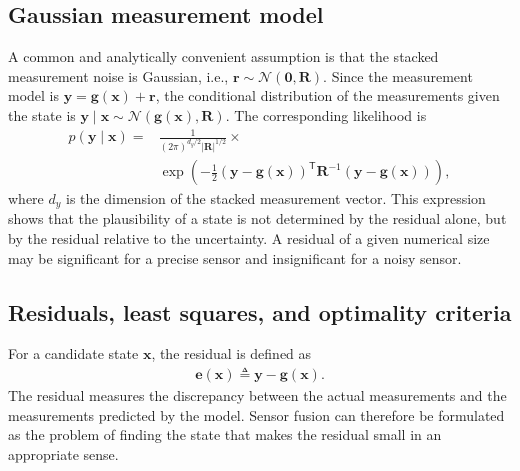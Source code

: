 \documentclass[11pt,oneside,openany]{book}
\begin{document}
\subsection{Gaussian measurement model}
A common and analytically convenient assumption is that the stacked measurement noise is Gaussian, i.e., $\mathbf{r} \sim \mathcal{N} \left( \mathbf{0}, \mathbf{R} \right)$. Since the measurement model is $\mathbf{y}=\mathbf{g}(\mathbf{x})+\mathbf{r}$, the conditional distribution of the measurements given the state is $\mathbf{y}\mid\mathbf{x} \sim \mathcal{N} \left( \mathbf{g}(\mathbf{x}), \mathbf{R} \right)$. 
The corresponding likelihood is
\begin{align}
\label{eq:Gaussianlikelihood}
p(\mathbf{y}\mid\mathbf{x}) =& \frac{1} {(2\pi)^{d_y/2}|\mathbf{R}|^{1/2}}\times  \\ 
&\exp \left( - \frac{1}{2} \left( \mathbf{y}-\mathbf{g}(\mathbf{x})\right)^{\mathsf T}\mathbf{R}^{-1}\left(\mathbf{y}-\mathbf{g}(\mathbf{x})\right)\right), \nonumber
\end{align}
where $d_y$ is the dimension of the stacked measurement vector. This expression shows that the plausibility of a state is not determined by the residual alone, but by the residual relative to the uncertainty. A residual of a given numerical size may be significant for a precise sensor and insignificant for a noisy sensor.

\subsection{Residuals, least squares, and optimality criteria}
For a candidate state $\mathbf{x}$, the residual is defined as
\begin{align}
\mathbf{e}(\mathbf{x}) \triangleq \mathbf{y} - \mathbf{g}(\mathbf{x}).
\end{align}
The residual measures the discrepancy between the actual measurements and the measurements predicted by the model. Sensor fusion can therefore be formulated as the problem of finding the state that makes the residual small in an appropriate sense.
\end{document}
